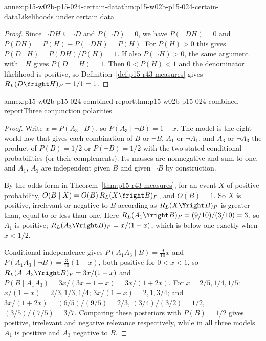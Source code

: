 \begin{annexitem}{annex:p15-w02b-p15-024-certain-data}{thm:p15-w02b-p15-024-certain-data}{Likelihoods under certain data}
\begin{proof}
Since \(\neg D H\subseteq\neg D\) and \(P(\neg D)=0\), we have
\(P(\neg D H)=0\) and \(P(DH)=P(H)-P(\neg DH)=P(H)\). For \(P(H)>0\)
this gives \(P(D\mid H)=P(DH)/P(H)=1\). If also \(P(\neg H)>0\), the
same argument with \(\neg H\) gives \(P(D\mid\neg H)=1\). Then
\(0<P(H)<1\) and the denominator likelihood is positive, so
Definition~\ref{def:p15-r43-measures} gives
\(R_L(D\Yright H)_P=1/1=1\).
\end{proof}
\end{annexitem}

\begin{annexitem}{annex:p15-w02b-p15-024-combined-report}{thm:p15-w02b-p15-024-combined-report}{Three conjunction polarities}
\begin{proof}
Write \(x=P(A_3\mid B)\), so \(P(A_3\mid\neg B)=1-x\). The model is
the eight-world law that gives each combination of \(B\) or \(\neg B\),
\(A_1\) or \(\neg A_1\), and \(A_3\) or \(\neg A_3\) the product of
\(P(B)=1/2\) or \(P(\neg B)=1/2\) with the two stated conditional
probabilities (or their complements). Its masses are nonnegative and sum
to one, and \(A_1\), \(A_3\) are independent given \(B\) and given
\(\neg B\) by construction.

By the odds form in Theorem~\ref{thm:p15-r43-measures}, for an event
\(X\) of positive probability,
\(O(B\mid X)=O(B)\,R_L(X\Yright B)_P\), and \(O(B)=1\). So \(X\) is
positive, irrelevant or negative to \(B\) according as
\(R_L(X\Yright B)_P\) is greater than, equal to or less than one.
Here \(R_L(A_1\Yright B)_P=(9/10)/(3/10)=3\), so \(A_1\) is positive;
\(R_L(A_3\Yright B)_P=x/(1-x)\), which is below one exactly when
\(x<1/2\).

Conditional independence gives
\(P(A_1A_3\mid B)=\tfrac9{10}x\) and
\(P(A_1A_3\mid\neg B)=\tfrac3{10}(1-x)\), both positive for
\(0<x<1\), so \(R_L(A_1A_3\Yright B)_P=3x/(1-x)\) and
\(P(B\mid A_1A_3)=3x/(3x+1-x)=3x/(1+2x)\). For \(x=2/5,1/4,1/5\):
\(x/(1-x)=2/3,1/3,1/4\); \(3x/(1-x)=2,1,3/4\); and
\(3x/(1+2x)=(6/5)/(9/5)=2/3\), \((3/4)/(3/2)=1/2\),
\((3/5)/(7/5)=3/7\). Comparing these posteriors with \(P(B)=1/2\) gives
positive, irrelevant and negative relevance respectively, while in all
three models \(A_1\) is positive and \(A_3\) negative to \(B\).
\end{proof}
\end{annexitem}


